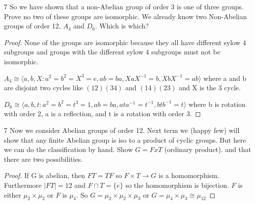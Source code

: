 \documentclass{article}
\begin{document}
\bigskip

\begin{PROB}{7}\label{Problem 7.}
    So we have shown that a non-Abelian group of order 3 is one of three groups. Prove no two of these groups are isomorphic. We already know two Non-Abelian groups of order 12, $A_4$ and $D_6$. Which is which? 
\end{PROB}
\begin{proof}
    None of the groups are isomorphic because they all have different sylow 4 subgroups and groups with the different sylow 4 subgroups must not be isomorphic.

    $A_4 \cong \langle a, b, X : a^2 = b^2 = X^3 = e, ab = ba, XaX^{-1} = b, XbX^{-1} = ab \rangle$ where a and b are disjoint two cycles like $(1 2)(3 4)$ and $(1 4)(2 3)$ and X is the 3 cycle.
    
    $D_6 \cong \langle a, b, t : a^2 = b^2 = t^3 = 1, ab = ba, ata^{-1} = t^{-1}, btb^{-1} = t \rangle$ where b is rotation with order 2, a is a reflection, and t is a rotation with order 3.
\end{proof}

\bigskip

\begin{PROB}{7}\label{Problem 7.}
    Now we consider Abelian groups of order 12. Next term we (happy few) will show that any finite Abelian group is iso to a product of cyclic groups. But here we can do the classification by hand. Show $G = F x T$ (ordinary product). and that there are two possibilities.
\end{PROB}
\begin{proof}
    If G is abelian, then $FT = TF$ so $F \times T \to G$ is a homomorphism. Furthermore $|FT| = 12$ and $F \cap T = \{e\}$ so the homomorphism is bijection. $F$ is either $\mu_2 \times \mu_2$ or $F$ is $\mu_4$. So $G = \mu_2 \times \mu_2 \times \mu_3$ or $G = \mu_4 \times \mu_3 \cong \mu_{12}$
\end{proof}
\end{document}
